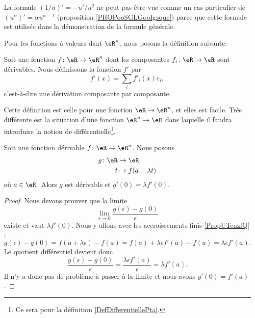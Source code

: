 \begin{remark}
	La formule \( (1/u)'=-u'/u^2\) ne peut pas être vue comme un cas particulier de \( (u^{\alpha})'=\alpha u^{\alpha-1}\) (proposition \ref{PROPooSGLGooIgzque}) parce que cette formule est utilisée dans la démonstration de la formule générale.
\end{remark}


Pour les fonctions à valeurs dant \( \eR^n\), nous posons la définition suivante.
\begin{definition}
	Soit une fonction \( f\colon \eR\to \eR^n\) dont les composantes \( f_i\colon \eR\to \eR\) sont dérivables. Nous définissons la fonction \( f'\) par
	\begin{equation}
		f'(x)=\sum_if'_i(x)e_i,
	\end{equation}
	c'est-à-dire une dérivation composante par composante.
\end{definition}

Cette définition est celle pour une fonction \( \eR\to \eR^n\), et elles est facile. Très différente est la situation d'une fonction \( \eR^n\to \eR\) dans laquelle il faudra introduire la notion de différentielle\footnote{Ce sera pour la définition \ref{DefDifferentiellePta}.}.

\begin{lemma}       \label{LEMooXHVBooHYjXdq}
	Soit une fonction dérivable \( f\colon \eR\to \eR^n\). Nous posons
	\begin{equation}
		\begin{aligned}
			g\colon \eR & \to \eR                \\
			t           & \mapsto f(a+\lambda t)
		\end{aligned}
	\end{equation}
	où \( a\in \eR\). Alors \( g\) est dérivable et \( g'(0)=\lambda  f'(0)\).
\end{lemma}

\begin{proof}
	Nous devons prouver que la limite
	\begin{equation}
		\lim_{\epsilon\to 0}\frac{ g(\epsilon)-g(0) }{ \epsilon }
	\end{equation}
	existe et vaut \( \lambda f'(0)\). Nous y allons avec les accroissements finis \ref{PropUTenzfQ} :
	\begin{equation}
		g(\epsilon)-g(0)=f(a+\lambda \epsilon)-f(a)=f(a)+\lambda \epsilon f'(a)-f(a)=\lambda\epsilon f'(a).
	\end{equation}
	Le quotient différentiel devient donc
	\begin{equation}
		\frac{ g(\epsilon)-g(0) }{ \epsilon }=\frac{ \lambda \epsilon f'(a) }{ \epsilon }=\lambda f'(a).
	\end{equation}
	Il n'y a donc pas de problème à passer à la limite et nous avons \( g'(0)=f'(a)\).
\end{proof}

